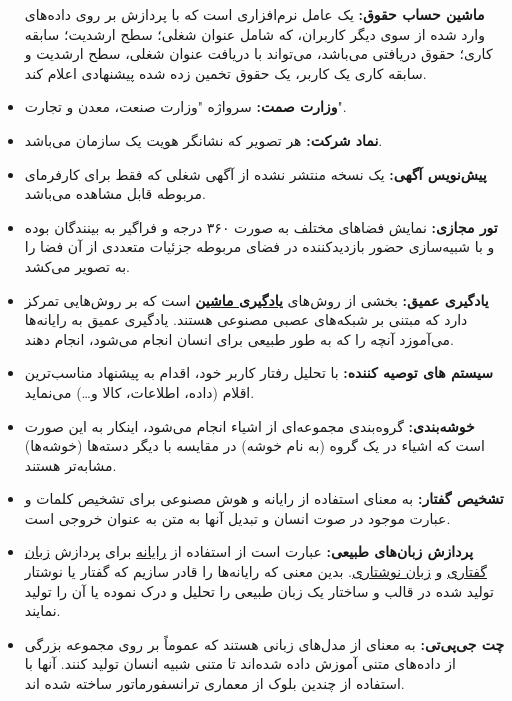 \documentclass[12pt]{article}
\begin{document}
\begin{itemize}
		\textbf{ماشین حساب حقوق:}
		یک عامل نرم‌افزاری است که با پردازش بر روی داده‌های وارد شده از سوی دیگر کاربران، که شامل عنوان شغلی؛ سطح ارشدیت؛ سابقه کاری؛ حقوق دریافتی می‌باشد، می‌تواند با دریافت عنوان شغلی، سطح ارشدیت و سابقه کاری یک کاربر، یک حقوق تخمین زده شده پیشنهادی اعلام کند.
		\item
		\textbf{وزارت صمت:}
		سرواژه "وزارت صنعت، معدن و تجارت".
		\item
		\textbf{نماد شرکت:}
		هر تصویر که نشانگر هویت یک سازمان می‌باشد.
		\item
		\textbf{پیش‌نویس آگهی:}
		یک نسخه منتشر نشده از آگهی شغلی که فقط برای کارفرمای مربوطه قابل مشاهده می‌باشد.
		\item
		\textbf{تور مجازی:‌}
		نمایش فضاهای مختلف به صورت ۳۶۰ درجه و فراگیر به بینندگان بوده و با شبیه‌سازی حضور بازدیدکننده در فضای مربوطه جزئیات متعددی از آن فضا را به تصویر می‌کشد.
		\item
		\textbf{یادگیری عمیق:}
		بخشی از روش‌های \textbf{\hyperref[ref:ml]{یادگیری ماشین}} است که بر روش‌هایی تمرکز دارد که مبتنی بر شبکه‌های عصبی مصنوعی هستند. یادگیری عمیق به رایانه‌ها می‌آموزد آنچه را که به طور طبیعی برای انسان انجام می‌شود، انجام دهند.
		\item
		\textbf{سیستم های توصیه کننده:}
		با تحلیل رفتار کاربر خود، اقدام به پیشنهاد مناسب‌ترین اقلام (داده، اطلاعات، کالا و…) می‌نماید.
		\item
		\textbf{خوشه‌بندی:}
		گروه‌بندی مجموعه‌ای از اشیاء انجام می‌شود، اینکار به این صورت است که اشیاء در یک گروه (به نام خوشه) در مقایسه با دیگر دسته‌ها (خوشه‌ها) مشابه‌تر هستند.
		\item
		\textbf{تشخیص گفتار:}
		به معنای استفاده از رایانه و هوش مصنوعی برای تشخیص کلمات و عبارت موجود در صوت انسان و تبدیل آنها به متن به عنوان خروجی است.
		\item
		\textbf{پردازش زبان‌های طبیعی:}
		عبارت است از استفاده از
		\href{https://fa.wikipedia.org/wiki/%D8%B1%D8%A7%DB%8C%D8%A7%D9%86%D9%87}{رایانه}
		برای پردازش
		\href{https://fa.wikipedia.org/wiki/%D8%B2%D8%A8%D8%A7%D9%86_%DA%AF%D9%81%D8%AA%D8%A7%D8%B1%DB%8C}{زبان گفتاری}
		و
		\href{https://fa.wikipedia.org/wiki/%D8%B2%D8%A8%D8%A7%D9%86_%D9%86%D9%88%D8%B4%D8%AA%D8%A7%D8%B1%DB%8C}{زبان نوشتاری}. بدین معنی که رایانه‌ها را قادر سازیم که گفتار یا نوشتار تولید شده در قالب و ساختار یک زبان طبیعی را تحلیل و درک نموده یا آن را تولید نمایند.
		\item
		\textbf{چت جی‌پی‌تی:}
		به معنای
		از مدل‌های زبانی هستند که عموماً بر روی مجموعه بزرگی از داده‌های متنی آموزش داده شده‌اند تا متنی شبیه انسان تولید کنند. آنها با استفاده از چندین بلوک از معماری ترانسفورماتور ساخته شده اند.
	\end{itemize}
\end{document}
